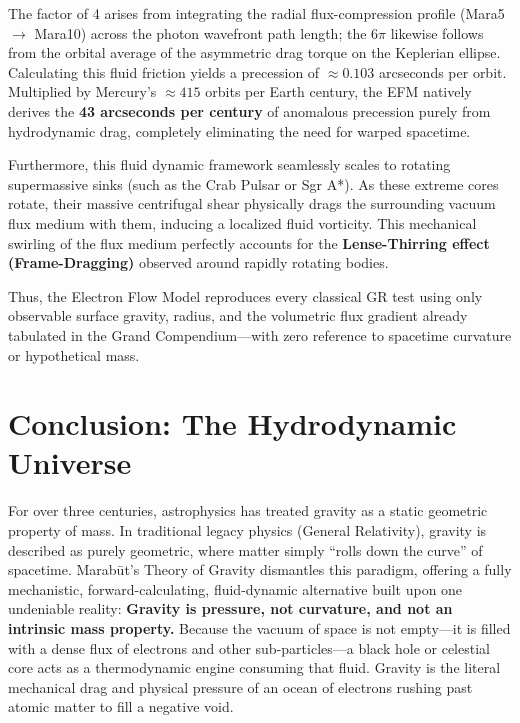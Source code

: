 \documentclass[11pt, a4paper]{article}
\begin{document}
  The factor of 4 arises from integrating the radial flux-compression profile (Mara5 $\rightarrow$ Mara10) across the photon wavefront path length; the $6\pi$ likewise follows from the orbital average of the asymmetric drag torque on the Keplerian ellipse. Calculating this fluid friction yields a precession of $\approx 0.103$ arcseconds per orbit. Multiplied by Mercury's $\approx 415$ orbits per Earth century, the EFM natively derives the \textbf{43 arcseconds per century} of anomalous precession purely from hydrodynamic drag, completely eliminating the need for warped spacetime.

  Furthermore, this fluid dynamic framework seamlessly scales to rotating supermassive sinks (such as the Crab Pulsar or Sgr A*). As these extreme cores rotate, their massive centrifugal shear physically drags the surrounding vacuum flux medium with them, inducing a localized fluid vorticity. This mechanical swirling of the flux medium perfectly accounts for the \textbf{Lense-Thirring effect (Frame-Dragging)} observed around rapidly rotating bodies.

  Thus, the Electron Flow Model reproduces every classical GR test using only observable surface gravity, radius, and the volumetric flux gradient already tabulated in the Grand Compendium---with zero reference to spacetime curvature or hypothetical mass.

\clearpage
\section{Conclusion: The Hydrodynamic Universe}

  For over three centuries, astrophysics has treated gravity as a static geometric property of mass. In traditional legacy physics (General Relativity), gravity is described as purely geometric, where matter simply ``rolls down the curve'' of spacetime. Marab\={u}t's Theory of Gravity dismantles this paradigm, offering a fully mechanistic, forward-calculating, fluid-dynamic alternative built upon one undeniable reality: \textbf{Gravity is pressure, not curvature, and not an intrinsic mass property.} Because the vacuum of space is not empty---it is filled with a dense flux of electrons and other sub-particles---a black hole or celestial core acts as a thermodynamic engine consuming that fluid. Gravity is the literal mechanical drag and physical pressure of an ocean of electrons rushing past atomic matter to fill a negative void.
\end{document}
